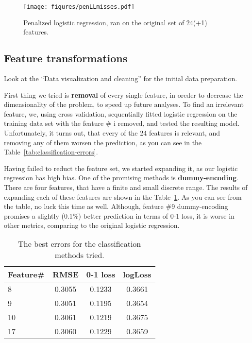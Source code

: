 \documentclass{article} %
\begin{document}
\begin{figure}[h]
\center
\texttt{[image: figures/penLLmisses.pdf]}
\caption{Penalized logistic regression, ran on the original set of 24(+1) features.}
\label{fig:penLLmisses}
\end{figure}

\subsection{Feature transformations}
Look at the ``Data visualization and cleaning'' for the initial data preparation.

First thing we tried is {\bf removal} of every single feature, in oreder to decrease the dimensionality of the problem, to speed up future analyses. To find an irrelevant feature, we, using cross validation, sequentially fitted logistic regression on the training data set with the feature \# i removed, and tested the resulting model. Unfortunately, it turns out, that every of the 24 features is relevant, and removing any of them worsen the prediction, as you can see in the Table~\ref{tab:classification-errors}.

Having failed to reduct the feature set, we started expanding it, as our logistic regression has high bias. One of the promising methods is {\bf dummy-encoding}. There are four features, that have a finite and small discrete range. The results of expanding each of these features are shown in the Table~\ref{tab:classification-dummy}. As you can see from the table, no luck this time as well. Although, feature \#9 dummy-encoding promises a slightly (0.1\%) better prediction in terms of 0-1 loss, it is worse in other metrics, comparing to the original logistic regression.
\begin{table}[h]
  \begin{center}
    \begin{tabular}{l|ccc}
      Feature\# & RMSE & 0-1 loss & logLoss \\
      \hline
      8 & 0.3055 & 0.1233 & 0.3661 \\
      9 & 0.3051 & 0.1195 & 0.3654 \\
      10 & 0.3061 & 0.1219 & 0.3675 \\
      17 & 0.3060 & 0.1229 & 0.3659
    \end{tabular}
    \caption{The best errors for the classification methods tried.}
    \label{tab:classification-dummy}
  \end{center}
\end{table}
\end{document}
